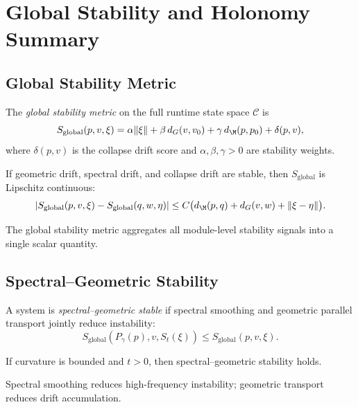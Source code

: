 \documentclass[11pt]{article}
\begin{document}
\section{Global Stability and Holonomy Summary}

\subsection{Global Stability Metric}

\begin{definition}
The \emph{global stability metric} on the full runtime state space
$\mathcal{C}$ is
\[
S_{\mathrm{global}}(p,v,\xi)
= \alpha \|\xi\|
+ \beta\, d_G(v,v_0)
+ \gamma\, d_\M(p,p_0)
+ \delta(p,v),
\]
where $\delta(p,v)$ is the collapse drift score and
$\alpha,\beta,\gamma > 0$ are stability weights.
\end{definition}

\begin{lemma}
If geometric drift, spectral drift, and collapse drift are stable, then
$S_{\mathrm{global}}$ is Lipschitz continuous:
\[
|S_{\mathrm{global}}(p,v,\xi) - S_{\mathrm{global}}(q,w,\eta)|
\le C \big( d_\M(p,q) + d_G(v,w) + \|\xi - \eta\| \big).
\]
\end{lemma}

\begin{remark}
The global stability metric aggregates all module-level stability signals
into a single scalar quantity.
\end{remark}

\subsection{Spectral--Geometric Stability}

\begin{definition}
A system is \emph{spectral--geometric stable} if spectral smoothing and
geometric parallel transport jointly reduce instability:
\[
S_{\mathrm{global}}(P_{\gamma}(p), v, S_t(\xi))
\le S_{\mathrm{global}}(p,v,\xi).
\]
\end{definition}

\begin{lemma}
If curvature is bounded and $t > 0$, then spectral--geometric stability
holds.
\end{lemma}

\begin{remark}
Spectral smoothing reduces high-frequency instability; geometric transport
reduces drift accumulation.
\end{remark}
\end{document}
